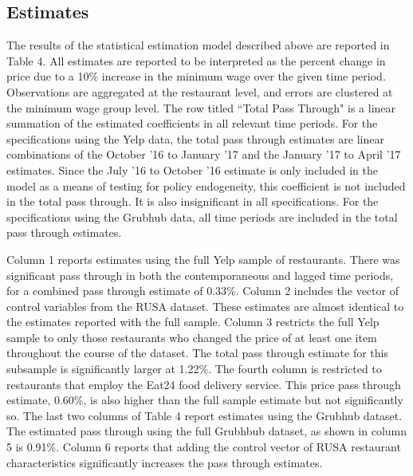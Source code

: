 \documentclass[11pt]{article}
\begin{document}
\subsection{Estimates}

The results of the statistical estimation model described above are reported in Table 4. All estimates are reported to be  interpreted as the percent change in price due to a 10\% increase in the minimum wage over the given time period. Observations are aggregated at the restaurant level, and errors are clustered at the minimum wage group level. The row titled ``Total Pass Through" is a linear summation of the estimated coefficients in all relevant time periods. For the specifications using the Yelp data, the total pass through estimates are linear combinations of the October '16 to January '17 and the January '17 to April '17 estimates. Since the July '16 to October '16 estimate is only included in the model as a means of testing for policy endogeneity, this coefficient is not included in the total pass through. It is also insignificant in all specifications. For the specifications using the Grubhub data, all time periods are included in the total pass through estimates. 

Column 1 reports estimates using the full Yelp sample of restaurants. There was significant pass through in both the contemporaneous and lagged time periods, for a combined pass through estimate of 0.33\%. Column 2 includes the vector of control variables from the RUSA dataset. These estimates are almost identical to the estimates reported with the full sample. Column 3 restricts the full Yelp sample to only those restaurants who changed the price of at least one item throughout the course of the dataset. The total pass through estimate for this subsample is significantly larger at 1.22\%. The fourth column is restricted to restaurants that employ the Eat24 food delivery service. This price pass through estimate, 0.60\%, is also higher than the full sample estimate but not significantly so. The last two columns of Table 4 report estimates using the Grubhub dataset. The estimated pass through using the full Grubhbub dataset, as shown in column 5 is 0.91\%. Column 6 reports that adding the control vector of RUSA restaurant characteristics significantly increases the pass through estimates. 
\end{document}
